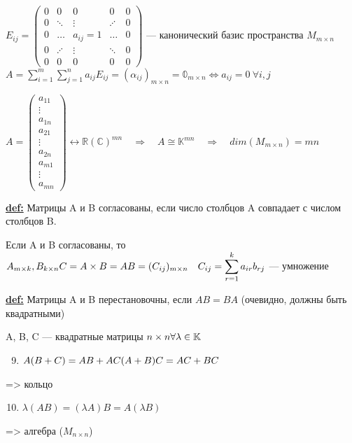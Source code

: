 \documentclass[twoside]{book}
\begin{document}
\( E_{ij} =
\begin{pmatrix}
    0 & 0       & 0          & 0       & 0 \\
    0 & \ddots  & \vdots     & \iddots & 0 \\
    0 & \ldots  & a_{ij} = 1 & \ldots  & 0 \\
    0 & \iddots & \vdots     & \ddots  & 0 \\
    0 & 0       & 0          & 0       & 0
\end{pmatrix}
\) --- канонический базис пространства $ M_{m \times n}$
\( A = \displaystyle{\sum^m_{i=1}\sum^{n}_{j=1}a_{ij}E_{ij}} = (\alpha_{ij})_{m \times n} = \mathbb{0}_{m \times n} \Leftrightarrow a_{ij} = 0 \ \forall i,j\)

\( A =
\begin{pmatrix}
    a_{11} \\
    \vdots \\
    a_{1n} \\
    a_{21} \\
    \vdots \\
    a_{2n} \\
    a_{m1} \\
    \vdots \\
    a_{mn}
\end{pmatrix} \leftrightarrow \mathbb{R(C)}^{mn}
\quad \Rightarrow \quad A \cong \mathbb{K}^{mn}
\quad \Rightarrow \quad dim(M_{m \times n}) = mn\)

\textbf{\underline{def:}} Матрицы A и B согласованы, если число столбцов A совпадает с числом столбцов B.

Если A и B согласованы, то
\( A_{m \times k}, B_{k \times n} \newline
C = A \times B = A B = (C_{ij})_{m \times n} \quad C_{ij} = \displaystyle{\sum^{k}_{r=1}a_{ir}b_{rj}} \)
--- умножение

\textbf{\underline{def:}} Матрицы A и B перестановочны, если $ AB = BA $ (очевидно, должны быть квадратными)

A, B, C --- квадратные матрицы $ n \times n \newline
    \forall \lambda \in \mathbb{K}$
\begin{enumerate}
    \setcounter{enumi}{8}
    \item $ A(B+C) = AB + AC \newline
              (A+B)C = AC + BC $
\end{enumerate} => кольцо

\begin{enumerate}
    \setcounter{enumi}{9}
    \item $ \lambda (AB) = (\lambda A)B = A(\lambda B)$
\end{enumerate} => алгебра ($ M_{n \times n} $)
\end{document}
